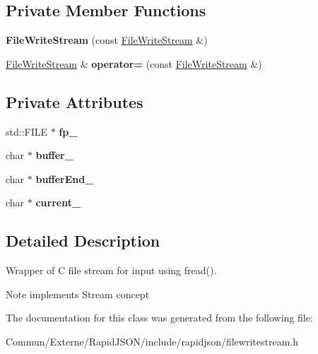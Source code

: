 \subsection*{Private Member Functions}
\begin{DoxyCompactItemize}
\item 
{\bfseries File\+Write\+Stream} (const \hyperlink{class_file_write_stream}{File\+Write\+Stream} \&)\hypertarget{class_file_write_stream_a62cc69f885b946b6bc2935f40c970cbb}{}\label{class_file_write_stream_a62cc69f885b946b6bc2935f40c970cbb}

\item 
\hyperlink{class_file_write_stream}{File\+Write\+Stream} \& {\bfseries operator=} (const \hyperlink{class_file_write_stream}{File\+Write\+Stream} \&)\hypertarget{class_file_write_stream_a82e33badcc890b78ed482de7f1266f97}{}\label{class_file_write_stream_a82e33badcc890b78ed482de7f1266f97}

\end{DoxyCompactItemize}
\subsection*{Private Attributes}
\begin{DoxyCompactItemize}
\item 
std\+::\+F\+I\+LE $\ast$ {\bfseries fp\+\_\+}\hypertarget{class_file_write_stream_aac23a58bdaa601d276c57b5bcf5b0246}{}\label{class_file_write_stream_aac23a58bdaa601d276c57b5bcf5b0246}

\item 
char $\ast$ {\bfseries buffer\+\_\+}\hypertarget{class_file_write_stream_a6a1f0fed15eb38f22935f11af493972f}{}\label{class_file_write_stream_a6a1f0fed15eb38f22935f11af493972f}

\item 
char $\ast$ {\bfseries buffer\+End\+\_\+}\hypertarget{class_file_write_stream_a1f30d1c653f30ca6e069cefb80881c75}{}\label{class_file_write_stream_a1f30d1c653f30ca6e069cefb80881c75}

\item 
char $\ast$ {\bfseries current\+\_\+}\hypertarget{class_file_write_stream_a3b3ba8e5deef1b12f0662e9031f05c71}{}\label{class_file_write_stream_a3b3ba8e5deef1b12f0662e9031f05c71}

\end{DoxyCompactItemize}


\subsection{Detailed Description}
Wrapper of C file stream for input using fread(). 

\begin{DoxyNote}{Note}
implements Stream concept 
\end{DoxyNote}


The documentation for this class was generated from the following file\+:\begin{DoxyCompactItemize}
\item 
Commun/\+Externe/\+Rapid\+J\+S\+O\+N/include/rapidjson/filewritestream.\+h\end{DoxyCompactItemize}
